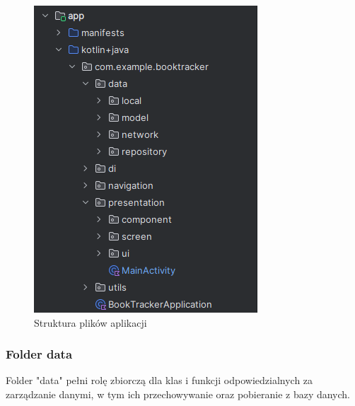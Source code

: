 \documentclass[12pt,twoside]{article}
\begin{document}
\begin{figure}[ht]
	\centering
	\includegraphics{figures/struktura.png}
	\caption{Struktura plików aplikacji}
\label{Fig:struktura}
\end{figure}

\subsubsection{Folder data}

Folder "data" pełni rolę zbiorczą dla klas i funkcji odpowiedzialnych za zarządzanie danymi, w tym ich przechowywanie 
oraz pobieranie z bazy danych.
\end{document}
